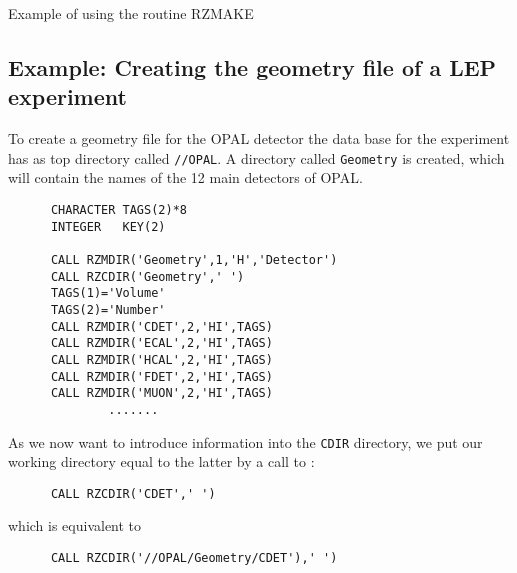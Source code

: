 \begin{XMPt}{Example of using the routine RZMAKE}
\subsection{Example: Creating the geometry file of a LEP experiment}
\par 
To create a geometry file for the OPAL detector
the data base for the experiment has as top directory called
{\tt //OPAL}.
A directory called {\tt Geometry} is created, which will contain
the names of the 12 main detectors of OPAL.
\begin{verbatim}
      CHARACTER TAGS(2)*8
      INTEGER   KEY(2)
 
      CALL RZMDIR('Geometry',1,'H','Detector')
      CALL RZCDIR('Geometry',' ')
      TAGS(1)='Volume'
      TAGS(2)='Number'
      CALL RZMDIR('CDET',2,'HI',TAGS)
      CALL RZMDIR('ECAL',2,'HI',TAGS)
      CALL RZMDIR('HCAL',2,'HI',TAGS)
      CALL RZMDIR('FDET',2,'HI',TAGS)
      CALL RZMDIR('MUON',2,'HI',TAGS)
              .......
\end{verbatim}
As we now want to introduce information into the {\tt CDIR} directory,
we put our working directory equal to the latter by a call to :
\begin{verbatim}
      CALL RZCDIR('CDET',' ')
\end{verbatim}
which is equivalent to
\begin{verbatim}
      CALL RZCDIR('//OPAL/Geometry/CDET'),' ')
\end{verbatim}

\end{XMPt}
